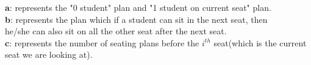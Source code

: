 \documentclass{assignment-373}
\begin{document}
\begin{enumerate}
\begin{enumerate}
\textrm{\phantom{=} \phantom{=} \phantom{=} \phantom{=} {\bf a}: represents the "0 student" plan and "1 student on current seat" plan.\\}
\phantom{=} \phantom{=} \phantom{=} \phantom{=} {\bf b}: represents the plan which if a student can sit in the next seat, then\\
\phantom{=} \phantom{=} \phantom{=} \phantom{=} he/she can also sit on all the other seat after the next seat.\\
\phantom{=} \phantom{=} \phantom{=} \phantom{=} {\bf c}: represents the number of seating plans before the $i^{th}$ seat(which is the current\\
\phantom{=} \phantom{=} \phantom{=} \phantom{=} seat we are looking at).\\


\end{enumerate}
\end{enumerate}
\end{document}
